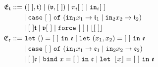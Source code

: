 \begin{align*}
    \mathfrak{E}_{\mathfrak{t}} ::=&~ ([~], \mathfrak{t}) \mid (\mathfrak{v}, [~]) \mid \pi_i [~] \mid \mathtt{in}_i [~] \\
    & \mid \mathtt{case}~[~]~\mathtt{of}~(\mathtt{in}_1 x_1 \rightarrow \mathfrak{t}_1 \mid \mathtt{in}_2 x_2 \rightarrow \mathfrak{t}_2) \\
    & \mid [~] \mathfrak{t} \mid \mathfrak{v} [~] \mid \mathtt{force}~[~] \mid \left\lfloor [~] \right\rfloor \\
    \mathfrak{E}_{\mathfrak{e}} ::=&~ \mathtt{let}~() = [~]~\mathtt{in}~\mathfrak{e} \mid \mathtt{let}~(x_1, x_2) = [~]~\mathtt{in}~\mathfrak{e} \\
    & \mid \mathtt{case}~[~]~\mathtt{of}~(\mathtt{in}_1 x_1 \rightarrow \mathfrak{e}_1 \mid \mathtt{in}_2 x_2 \rightarrow \mathfrak{e}_2) \\
    & \mid [~] \mathfrak{e} \mid \mathtt{bind}~x = [~]~\mathtt{in}~\mathfrak{e} \mid \mathtt{let}~\left\lfloor x \right\rfloor = [~]~\mathtt{in}~\mathfrak{e}
\end{align*}
